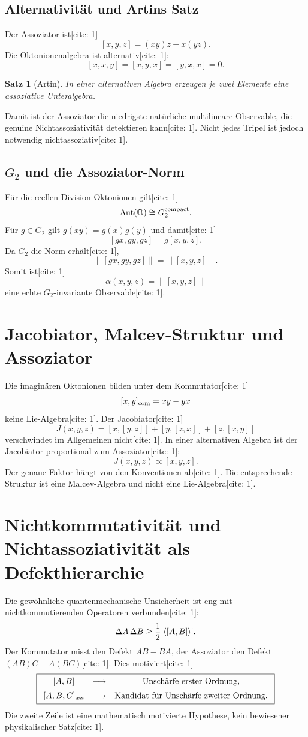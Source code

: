 \documentclass[11pt,a4paper]{article}
\newtheorem{theorem}{Satz}[section]
\newcommand{\OO}{\mathbb{O}}
\newcommand{\norm}[1]{\left\lVert #1 \right\rVert}
\DeclarePairedDelimiter{\abs}{\lvert}{\rvert}
\newcommand{\Aut}{\operatorname{Aut}}
\begin{document}
\subsection{Alternativität und Artins Satz}
Der Assoziator ist[cite: 1]
\[
[x,y,z]=(xy)z-x(yz).
\]
Die Oktonionenalgebra ist alternativ[cite: 1]:
\[
[x,x,y]=[x,y,x]=[y,x,x]=0.
\]
\begin{theorem}[Artin]
In einer alternativen Algebra erzeugen je zwei Elemente eine assoziative Unteralgebra.
\end{theorem}
Damit ist der Assoziator die niedrigste natürliche multilineare Observable, die genuine Nichtassoziativität detektieren kann[cite: 1]. Nicht jedes Tripel ist jedoch notwendig nichtassoziativ[cite: 1].

\subsection{$G_2$ und die Assoziator-Norm}
Für die reellen Division-Oktonionen gilt[cite: 1]
\[
\Aut(\OO)\cong G_2^{\rm compact}.
\]
Für $g\in G_2$ gilt $g(xy)=g(x)g(y)$ und damit[cite: 1]
\[
[gx,gy,gz]=g[x,y,z].
\]
Da $G_2$ die Norm erhält[cite: 1],
\[
\boxed{\norm{[gx,gy,gz]}=\norm{[x,y,z]}.}
\]
Somit ist[cite: 1]
\[
\boxed{\alpha(x,y,z)=\norm{[x,y,z]}}
\]
eine echte $G_2$-invariante Observable[cite: 1].

\section{Jacobiator, Malcev-Struktur und Assoziator}
Die imaginären Oktonionen bilden unter dem Kommutator[cite: 1]
\[
[x,y]_{\rm com}=xy-yx
\]
keine Lie-Algebra[cite: 1]. Der Jacobiator[cite: 1]
\[
J(x,y,z)=[x,[y,z]]+[y,[z,x]]+[z,[x,y]]
\]
verschwindet im Allgemeinen nicht[cite: 1]. In einer alternativen Algebra ist der Jacobiator proportional zum Assoziator[cite: 1]:
\[
\boxed{J(x,y,z)\propto[x,y,z].}
\]
Der genaue Faktor hängt von den Konventionen ab[cite: 1]. Die entsprechende Struktur ist eine Malcev-Algebra und nicht eine Lie-Algebra[cite: 1].

\section{Nichtkommutativität und Nichtassoziativität als Defekthierarchie}
Die gewöhnliche quantenmechanische Unsicherheit ist eng mit nichtkommutierenden Operatoren verbunden[cite: 1]:
\[
\Delta A\,\Delta B\ge\frac12\abs{\langle[A,B]\rangle}.
\]
Der Kommutator misst den Defekt $AB-BA$, der Assoziator den Defekt $(AB)C-A(BC)$[cite: 1]. Dies motiviert[cite: 1]
\[
\boxed{
\begin{array}{ccc}
[A,B]&\longrightarrow&\text{Unschärfe erster Ordnung},\\[0.5em]
[A,B,C]_{\rm ass}&\longrightarrow&\text{Kandidat für Unschärfe zweiter Ordnung}.
\end{array}}
\]
Die zweite Zeile ist eine mathematisch motivierte Hypothese, kein bewiesener physikalischer Satz[cite: 1].
\end{document}
